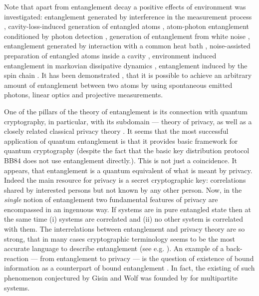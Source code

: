 \documentclass[twocolumn,aps,rmp]{revtex4}
\begin{document}
Note that apart from entanglement decay
a positive effects of environment was investigated: entanglement generated by interference in the measurement process
\cite {CabrilloCGZ1999,BoseKPV1999}, cavity-loss-induced generation of entangled atoms \cite {PlenioHBK1999}, atom-photon entanglement conditioned by photon detection  \cite {Horodecki2001}, generation of entanglement from white noise \cite{PlenioH2002}, entanglement generated by interaction with a common heat bath \cite{Braun2002}, noise-assisted preparation of entangled atoms inside a cavity \cite{YuYZS2003}, environment induced entanglement in markovian dissipative dynamics \cite {BenattiFP2003}, entanglement induced by the spin chain \cite {YiCW2006}. It has been demonstrated \cite{LamataGC2007}, that
it is possible to achieve an arbitrary amount of entanglement between two atoms by using spontaneous emitted photons, linear optics and projective measurements.


One of the pillars of the theory of entanglement is its connection
with quantum cryptography, in particular, with its subdomain ---
theory of privacy, as well as a closely related classical privacy
theory \cite{GisinWolf_QKAvsCKA,GisinWolf_linking,Collins-Popescu}. It
seems that the most successful application of quantum entanglement is
that it provides basic framework for quantum cryptography (despite the
fact that the basic key distribution protocol BB84 does not use
entanglement directly.). This is not just a coincidence. It appears,
that entanglement is a quantum equivalent of what is meant by privacy.
Indeed the main resource for privacy is a secret cryptographic key:
correlations shared by interested persons but not known by any other
person. Now, in the {\it single} notion of entanglement two
fundamental features of privacy are encompassed in an ingenuous
way. If systems are in pure entangled state then at the same time (i)
systems are correlated and (ii) no other system is correlated with
them. The interrelations between entanglement and privacy theory are
so strong, that in many cases cryptographic terminology seems to be
the most accurate language to describe entanglement (see e.g.
\cite{DevetakWinter-hash}). An example of a back-reaction --- from
entanglement to privacy --- is the question of existence of bound
information as a counterpart of bound entanglement
\cite{GisinWolf_linking}. In fact, the existing of such phenomenon
conjectured by Gisin and Wolf was founded by \cite
{AcinCM-MultiBoundInfo} for multipartite systems.
\end{document}
